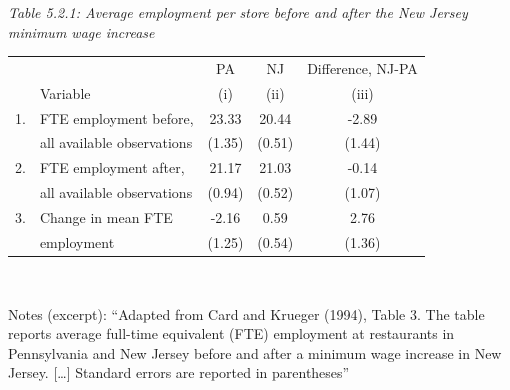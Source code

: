 \documentclass[11pt,a4paper]{article}
\begin{document}
\begin{center}\small
\textit{Table 5.2.1: Average employment per store before and after the New Jersey minimum wage increase}\\[2pt]
\begin{tabular}{llccc}
\toprule
 & & PA & NJ & Difference, NJ-PA\\
 & Variable & (i) & (ii) & (iii)\\
\midrule
1. & FTE employment before, & 23.33 & 20.44 & -2.89\\
 & all available observations & (1.35) & (0.51) & (1.44)\\
2. & FTE employment after, & 21.17 & 21.03 & -0.14\\
 & all available observations & (0.94) & (0.52) & (1.07)\\
3. & Change in mean FTE & -2.16 & 0.59 & 2.76\\
 & employment & (1.25) & (0.54) & (1.36)\\
\bottomrule
\end{tabular}\\[2pt]
\parbox{0.9\linewidth}{\footnotesize Notes (excerpt): ``Adapted from Card and Krueger (1994), Table 3. The table
reports average full-time equivalent (FTE) employment at restaurants in Pennsylvania and New Jersey before
and after a minimum wage increase in New Jersey. [\dots] Standard errors are reported in parentheses''}
\end{center}
\end{document}

